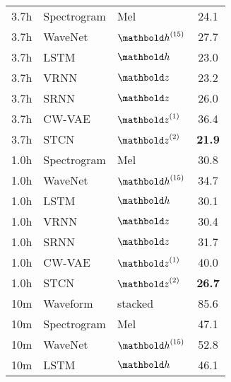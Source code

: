 \begin{table}[t]
\begin{minipage}[t]{.45\textwidth}
\begin{adjustbox}{center, totalheight=0.35\paperheight}
\begin{tabular}[t]{cll|c}
        3.7h   &  Spectrogram     & Mel           &   24.1   \\  %
        3.7h   &  WaveNet         & $\hb^{(15)}$  &   27.7   \\  %
        3.7h   &  LSTM            & $\hb$         &   23.0   \\  %
        3.7h   &  VRNN            & $\zb$         &   23.2   \\  %
        3.7h   &  SRNN            & $\zb$         &   26.0   \\  %
        3.7h   &  CW-VAE          & $\zb^{(1)}$   &   36.4   \\  %
        3.7h   &  STCN            & $\zb^{(2)}$   &   \textbf{21.9}   \\  %
        \midrule
        1.0h   &  Spectrogram     & Mel           &   30.8   \\  %
        1.0h   &  WaveNet         & $\hb^{(15)}$  &   34.7   \\  %
        1.0h   &  LSTM            & $\hb$         &   30.1   \\  %
        1.0h   &  VRNN            & $\zb$         &   30.4   \\  %
        1.0h   &  SRNN            & $\zb$         &   31.7   \\  %
        1.0h   &  CW-VAE          & $\zb^{(1)}$   &   40.0   \\  %
        1.0h   &  STCN            & $\zb^{(2)}$   &   \textbf{26.7}   \\  %
        \midrule
        10m    &  Waveform        & stacked       &   85.6   \\  %
        10m    &  Spectrogram     & Mel           &   47.1   \\  %
        10m    &  WaveNet         & $\hb^{(15)}$  &   52.8   \\  %
        10m    &  LSTM            & $\hb$         &   46.1   \\  %

\end{tabular}
\end{adjustbox}
\end{minipage}
\end{table}
